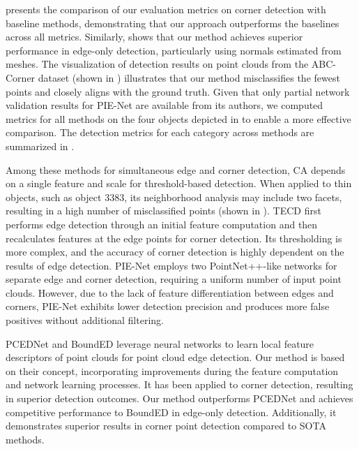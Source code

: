 \documentclass[lettersize,journal]{IEEEtran}
\begin{document}
 presents the comparison of our evaluation metrics on corner detection with baseline methods, demonstrating that our approach outperforms the baselines across all metrics. Similarly,  shows that our method achieves superior performance in edge-only detection, particularly using normals estimated from meshes. The visualization of detection results on point clouds from the ABC-Corner dataset (shown in ) illustrates that our method misclassifies the fewest points and closely aligns with the ground truth. Given that only partial network validation results for PIE-Net are available from its authors, we computed metrics for all methods on the four objects depicted in  to enable a more effective comparison. The detection metrics for each category across methods are summarized in .

Among these methods for simultaneous edge and corner detection, CA depends on a single feature and scale for threshold-based detection. When applied to thin objects, such as object 3383, its neighborhood analysis may include two facets, resulting in a high number of misclassified points (shown in ). TECD first performs edge detection through an initial feature computation and then recalculates features at the edge points for corner detection. Its thresholding is more complex, and the accuracy of corner detection is highly dependent on the results of edge detection. PIE-Net employs two PointNet++-like networks for separate edge and corner detection, requiring a uniform number of input point clouds. However, due to the lack of feature differentiation between edges and corners, PIE-Net exhibits lower detection precision and produces more false positives without additional filtering. 

PCEDNet and BoundED leverage neural networks to learn local feature descriptors of point clouds for point cloud edge detection. Our method is based on their concept, incorporating improvements during the feature computation and network learning processes. It has been applied to corner detection, resulting in superior detection outcomes. Our method outperforms PCEDNet and achieves competitive performance to BoundED in edge-only detection. Additionally, it demonstrates superior results in corner point detection compared to SOTA methods.
\end{document}
